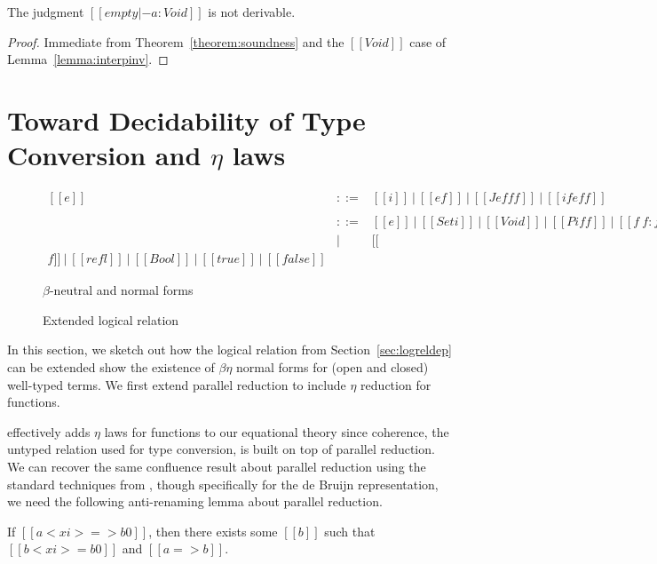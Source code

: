 \documentclass[acmsmall]{acmart}
\begin{document}
\begin{corollary}
  \label{corollary:consistency}
  The judgment $[[empty |- a : Void ]]$ is not derivable.
\end{corollary}
\begin{proof}
  Immediate from Theorem~\ref{theorem:soundness} and the $[[Void]]$ case of Lemma~\ref{lemma:interpinv}.
\end{proof}

\section{Toward Decidability of Type Conversion and $\eta$ laws}
\label{sec:extension}
\begin{figure}[h]
  \[
    \begin{array}{lcl}
      [[e]] & ::= & [[i]]\ |\ [[e f]]\ |\ [[J e f f f]]\ |\ [[if e f
                    f]] \\ \\
      [[f]] & ::= & [[e]]\ |\ [[Set i]]\ |\ [[Void]]\ |\ [[Pi f f]]\
                    |\ [[f ~ f : f]]\\
            & |   & [[\\ f]]\ |\ [[refl]]\ |\ [[Bool]]\ |\ [[true]]\ |\ [[false]]
    \end{array}
  \]
  \caption{$\beta$-neutral and normal forms}
  \label{fig:nenf}
\end{figure}
\begin{figure}[h]
  \caption{Extended logical relation}
  \label{fig:logrelopen}
\end{figure}

In this section, we sketch out how the logical relation from
Section~\ref{sec:logreldep} can be extended show the existence of
$\beta\eta$ normal forms for (open and closed) well-typed terms. We
first extend parallel reduction to include $\eta$ reduction for
functions.
\begin{center}
\end{center}
 effectively adds $\eta$ laws for functions to our
equational theory since coherence, the untyped relation used for type
conversion, is built on top of parallel reduction. We can recover the
same confluence result about parallel reduction using the standard
techniques from \citet{barendregt:lambda-calculi-with-types,
takahashi-parallel-reduction}, though specifically for the de Bruijn
representation, we need the following anti-renaming lemma about
parallel reduction.
\begin{lemma}
  \label{lemma:parantirenaming} If $[[a < xi > => b0]]$, then there
exists some $[[b]]$ such that $[[b < xi > = b0]]$ and $[[a => b]]$.
\end{lemma}
\end{document}
